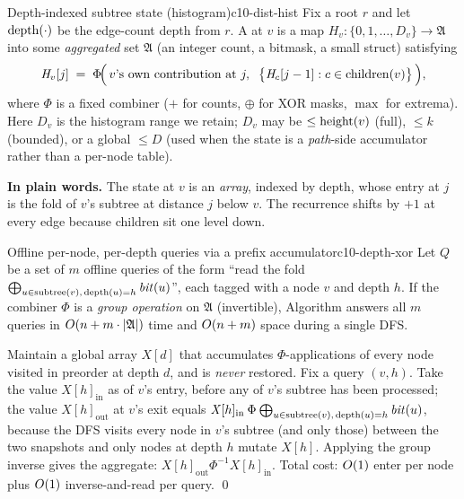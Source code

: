 \begin{definition}{Depth-indexed subtree state (histogram)}{c10-dist-hist}
Fix a root $r$ and let $\operatorname{depth}(\cdot)$ be the edge-count depth from $r$.
A  at $v$ is a map
$\mathit{H}_v\colon \{0,1,\dots,D_v\}\to \mathfrak{A}$ into some
\emph{aggregated} set $\mathfrak{A}$ (an integer count, a bitmask, a
small struct) satisfying
\[
  \mathit{H}_v[j]
  \;=\;
  \Phi\!\Big(\,v\text{'s own contribution at }j,\;\;\big\{\mathit{H}_c[j-1]:c\in\operatorname{children}(v)\big\}\,\Big),
\]
where $\Phi$ is a fixed combiner ($+$ for counts, $\oplus$ for XOR
masks, $\max$ for extrema). Here $D_v$ is the histogram range we retain;
$D_v$ may be $\le \operatorname{height}(v)$ (full), $\le k$ (bounded), or a global
$\le D$ (used when the state is a \emph{path}-side accumulator rather
than a per-node table).
\end{definition}

\noindent\textbf{In plain words.} The state at $v$ is an \emph{array},
indexed by depth, whose entry at $j$ is the fold of $v$'s subtree at
distance $j$ below $v$. The recurrence shifts by $+1$ at every edge
because children sit one level down.

\begin{theorem}{Offline per-node, per-depth queries via a prefix accumulator}{c10-depth-xor}
Let $Q$ be a set of $m$ offline queries of the form ``read the fold
$\bigoplus_{u \in \mathrm{subtree}(v),\,\operatorname{depth}(u)=h} \mathit{bit}(u)$'',
each tagged with a node $v$ and depth $h$. If the combiner $\Phi$ is a
\emph{group operation} on $\mathfrak A$ (invertible), Algorithm
 answers all $m$ queries in $O(n + m \cdot |\mathfrak{A}|)$
time and $O(n + m)$ space during a single DFS.
\end{theorem}
\begin{proofbox}
Maintain a global array $\mathit{X}[d]$ that accumulates $\Phi$-applications
of every node visited in preorder at depth $d$, and is \emph{never}
restored. Fix a query $(v,h)$. Take the value $\mathit{X}[h]_{\mathrm{in}}$
as of $v$'s entry, before any of $v$'s subtree has been processed; the
value $\mathit{X}[h]_{\mathrm{out}}$ at $v$'s exit equals
$\mathit{X}[h]_{\mathrm{in}} \mathbin{\Phi} \bigoplus_{u \in \mathrm{subtree}(v),\,\operatorname{depth}(u)=h} \mathit{bit}(u)$,
because the DFS visits every node in $v$'s subtree (and only those)
between the two snapshots and only nodes at depth $h$ mutate
$\mathit{X}[h]$. Applying the group inverse gives the aggregate:
$\mathit{X}[h]_{\mathrm{out}} \mathbin{\Phi^{-1}} \mathit{X}[h]_{\mathrm{in}}$. Total cost:
$O(1)$ enter per node plus $O(1)$ inverse-and-read per query. \qed
\end{proofbox}

